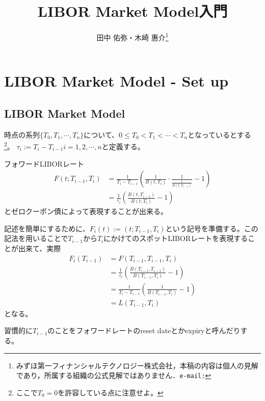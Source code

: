\documentclass[11pt]{jarticle}
\newcommand{\0}{\mbox{\boldmath $0$}}
\newcommand{\1}{\mbox{\boldmath \large$1$}}
\theoremstyle{definition}
\begin{document}
\title{LIBOR Market Model入門}
\author{田中 佑弥・木崎 惠介\footnote{みずほ第一フィナンシャルテクノロジー株式会社，本稿の内容は個人の見解であり，所属する組織の公式見解ではありません．\texttt{e-mail:}}}

\maketitle

\section{LIBOR Market Model - Set up}
\subsection{LIBOR Market Model}
時点の系列$\{T_0,T_1,\cdots ,T_n\}$について、$0\leq T_0 < T_1< \cdots <T_n$となっているとする\footnote{ここで$T_0=0$を許容している点に注意せよ。}。
$\tau_i := T_i - T_{i-1} i=1,2,\cdots ,n$と定義する。

フォワードLIBORレート 
\begin{align}
F(t; T_{i-1}, T_i) 
& = \frac{1}{T_i-T_{i-1}}\left( \frac{1}{B(t,T_i)} \cdot \frac{1}{\frac{1}{B(t, T_{i-1})}}-1\right)\\
& = \frac{1}{\tau_i}\left( \frac{B(t, T_{i-1})}{B(t,T_i)}-1\right)
\end{align}
とゼロクーポン債によって表現することが出来る。

記述を簡単にするために、$F_i(t):=(t; T_{i-1}, T_i)$という記号を準備する。この記法を用いることで$T_{i-1}$から$T_i$にかけてのスポットLIBORレートを表現することが出来て、実際
\begin{align}
F_i(T_{i-1})
&=F( T_{i-1}, T_{i-1},T_i) \nonumber \\
&=\frac{1}{\tau_i}\left( \frac{B(T_{i-1},T_{i-1} )}{B(T_{i-1},T_i)}-1\right)\nonumber \\
&=\frac{1}{T_i-T_{i-1}}\left( \frac{1}{B(T_{i-1},T_i)}-1\right) \nonumber \\
&=L(T_{i-1},T_i)
\end{align}
となる。

習慣的に$T_{i-1}$のことをフォワードレートのreset dateとかexpiryと呼んだりする。
\end{document}
